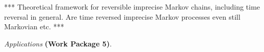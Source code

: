 \documentclass[11pt,dvipsnames,usenames,a4paper]{article}
\begin{document}
%
%	
%

*** Theoretical framework for reversible imprecise Markov chains, including time reversal in general. Are time reversed imprecise Markov processes even still Markovian etc. ***




\vspace{5pt}
\emph{Applications} {\bf (Work Package 5)}.
\vspace{3pt}
\end{document}
